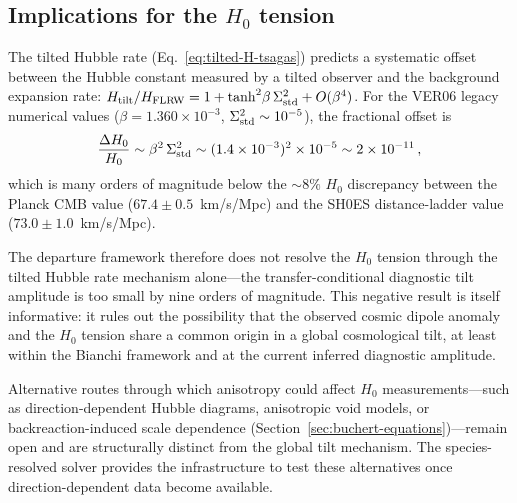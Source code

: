 \subsection{Implications for the $H_0$ tension}
\label{sec:disc-H0}

The tilted Hubble rate
(Eq.~\ref{eq:tilted-H-tsagas}) predicts a systematic
offset between the Hubble constant measured by a tilted
observer and the background expansion rate:
$H_{\rm tilt} / H_{\rm FLRW} = 1 + \tanh^2\!\beta\,
\Sigma^2_{\mathrm{std}} + O(\beta^4)$.  For the VER06 legacy numerical values
($\beta = 1.360 \times 10^{-3}$,
$\Sigma^2_{\mathrm{std}} \sim 10^{-5}$), the fractional offset is
\begin{equation}\label{eq:H0-offset}
\frac{\Delta H_0}{H_0}
\sim \beta^2\,\Sigma^2_{\mathrm{std}}
\sim (1.4 \times 10^{-3})^2 \times 10^{-5}
\sim 2 \times 10^{-11}\,,
\end{equation}
which is many orders of magnitude below the $\sim\!8\%$
$H_0$ discrepancy between the Planck CMB value
($67.4 \pm 0.5$~km/s/Mpc) and the SH0ES distance-ladder
value ($73.0 \pm 1.0$~km/s/Mpc).

The departure framework therefore does not resolve the
$H_0$ tension through the tilted Hubble rate mechanism
alone---the transfer-conditional diagnostic tilt amplitude is too small by nine orders of
magnitude.  This negative result is itself informative: it
rules out the possibility that the observed cosmic dipole
anomaly and the $H_0$ tension share a common origin in a
global cosmological tilt, at least within the Bianchi
framework and at the current inferred diagnostic amplitude.

Alternative routes through which anisotropy could affect
$H_0$ measurements---such as direction-dependent Hubble
diagrams, anisotropic void models, or backreaction-induced
scale dependence (Section~\ref{sec:buchert-equations})---remain
open and are structurally distinct from the global tilt
mechanism.  The species-resolved solver provides the
infrastructure to test these alternatives once
direction-dependent data become available.



